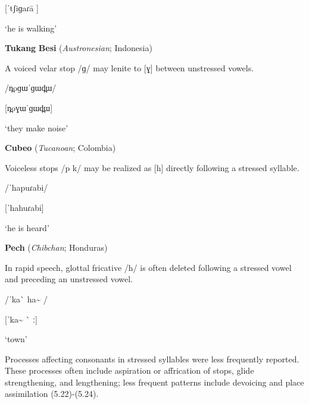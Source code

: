 [ˈtʃiɡaɾa\={} ]



‘he is walking’



\citep[5]{Bradley1970}
\z



\ea\label{ex:(5.19)}
  \textbf{Tukang} \textbf{Besi} (\textit{Austronesian}; Indonesia)



A voiced velar stop /ɡ/ may lenite to [ɣ] between unstressed vowels.



/n̪oɡɯˈɡɯd̪ɯ/



[n̪oɣɯˈɡɯd̪ɯ]



‘they make noise’



\citep[27]{Donohue1999}

\z


\ea\label{ex:(5.20)}
  \textbf{Cubeo} (\textit{Tucanoan}; Colombia)



Voiceless stops /p k/ may be realized as [h] directly following a stressed syllable.



/ˈhapuɾabi/



[ˈhahuɾabi]



‘he is heard’



\citep[123]{Chacon2012}
\z



\ea\label{ex:(5.21)}
  \textbf{Pech} (\textit{Chibchan}; Honduras)



In rapid speech, glottal fricative /h/ is often deleted following a stressed vowel and preceding an unstressed vowel.



/ˈka\`{} ha\~{} /



[ˈka\~{} \`{} ː]



‘town’



\citep[24]{Holt1999}
\z



  Processes affecting consonants in stressed syllables were less frequently reported. These processes often include aspiration or affrication of stops, glide strengthening, and lengthening; less frequent patterns include devoicing and place assimilation (5.22)-(5.24).



